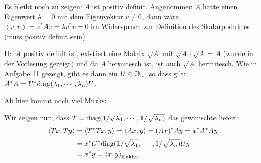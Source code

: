 Es bleibt noch zu zeigen: $A$ ist positiv definit. Angenommen $A$ hätte einen
Eigenwert $\lambda = 0$ mit dem Eigenvektor $v \ne 0$, dann wäre
$\left<v,v\right> = v^* A v = \lambda v^* v = 0$ im Widerspruch zur Definition
des Skalarpoduktes (muss positiv definit sein).

Da $A$ positiv definit ist, existiert eine Matrix $\sqrt{A}$ mit $\sqrt{A} \cdot \sqrt{A} = A$
(wurde in der Vorlesung gezeigt) und da $A$ hermitesch ist, ist auch $\sqrt{A}$ hermitesch.
Wie in Aufgabe 11 gezeigt, gibt es dann ein $U \in \mathbb O_n$, so dass gilt:
$A^* A = U^* \mathrm{diag}(\lambda_1, \cdots,\lambda_n) U$.

Ab hier kommt noch viel Murks:

Wir zeigen nun, dass $T = \mathrm{diag}(1 / \sqrt{\lambda_1}, \cdots, 1 / \sqrt{\lambda_n)}$ das gewünschte liefert:
\begin{align*}
  \left<T x,T y\right> &= \left<T^* T x, y\right> =  \left<A x, y\right> = (A x)^* A y
  = x^* A^* A y\\
  &= x^* U^* \mathrm{diag}(1 / \sqrt{\lambda_1}, \cdots, 1 / \sqrt{\lambda_n)} U   y \\
  &= x^* y = \left<x, y\right>_\text{Euklid}
\end{align*}








